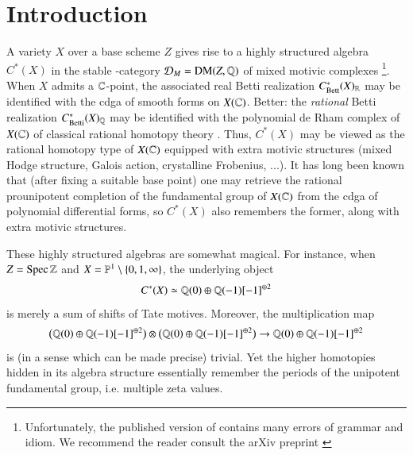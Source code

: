 \maketitle

\setcounter{tocdepth}{2}
\tableofcontents

\raggedbottom
{}

\section{Introduction}
\label{Sec:Int}

A variety $X$ over a base scheme $Z$ gives rise to a highly structured algebra $C^*(X)$ in the stable \oo-category $\mathcal{D}_M = \operatorname{DM}(Z, \mathbb{Q})$ of mixed motivic complexes \cite{Iwanari, rmps, mrmht, DCBetts}\footnote{Unfortunately, the published version of \cite{rmps} contains many errors of grammar and idiom. We recommend the reader consult the arXiv preprint \cite{rmps_arXiv}}. When $X$ admits a $\mathbb{C}$-point, the associated real Betti realization $C^*_{\mathrm{Bett}}(X)_{\mathbb{R}}$ may be identified with the cdga of smooth forms on $X(\mathbb{C})$. Better: the \textit{rational} Betti realization $C^*_{\mathrm{Betti}}(X)_{\mathbb{Q}}$ may be identified with the polynomial de Rham complex of $X(\mathbb{C})$ of classical rational homotopy theory \cite{Sullivan}. Thus, $C^*(X)$ may be viewed as the rational homotopy type of $X(\mathbb{C})$ equipped with extra motivic structures (mixed Hodge structure, Galois action, crystalline Frobenius, ...). It has long been known that (after fixing a suitable base point) one may retrieve the rational prounipotent completion of the fundamental group of $X(\mathbb{C})$ from the cdga of polynomial differential forms, so $C^*(X)$ also remembers the former, along with extra motivic structures. 

These highly structured algebras are somewhat magical. For instance, when $Z = \operatorname{Spec} \mathbb{Z}$ and $X = \mathbb{P}^1 \setminus \{0,1,\infty\}$, the underlying object 
\[
C^*(X) \simeq \mathbb{Q}(0) \oplus \mathbb{Q}(-1)[-1]^{\oplus 2}
\]
is merely a sum of shifts of Tate motives. Moreover, the multiplication map
\[
\big( \mathbb{Q}(0) \oplus \mathbb{Q}(-1)[-1]^{\oplus 2} \big)
\otimes
\big( \mathbb{Q}(0) \oplus \mathbb{Q}(-1)[-1]^{\oplus 2} \big)
\to
\mathbb{Q}(0) \oplus \mathbb{Q}(-1)[-1]^{\oplus 2}
\]
is (in a sense which can be made precise) trivial. Yet the higher homotopies hidden in its algebra structure essentially remember the periods of the unipotent fundamental group, i.e. multiple zeta values. 

